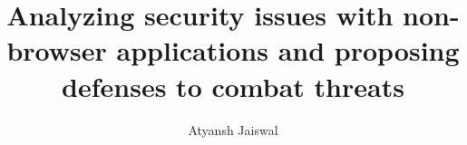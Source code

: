 %
%
%
%



\title{Analyzing security issues with non-browser applications and proposing defenses to combat threats}

\author{Atyansh Jaiswal}



%



